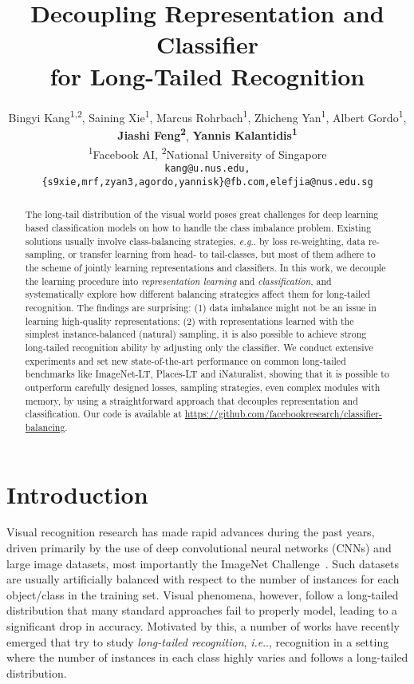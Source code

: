 \documentclass[dvipsnames]{article} \usepackage{iclr2020_conference, times}
\title{Decoupling Representation and Classifier \\ for Long-Tailed Recognition}
\author{Bingyi Kang\textsuperscript{1,2},
Saining Xie\textsuperscript{1},
Marcus Rohrbach\textsuperscript{1},
Zhicheng Yan\textsuperscript{1},
Albert Gordo\textsuperscript{1}, \\ 
\textbf{Jiashi Feng\textsuperscript{2}},
\textbf{Yannis Kalantidis\textsuperscript{1}} \\
\textsuperscript{1}Facebook AI, \textsuperscript{2}National University of Singapore  \\
\texttt{kang@u.nus.edu,\{s9xie,mrf,zyan3,agordo,yannisk\}@fb.com,elefjia@nus.edu.sg}
}
\makeatletter
\DeclareRobustCommand\onedot{\futurelet\@let@token\@onedot}
\def\@onedot{\ifx\@let@token.\else.\null\fi\xspace}
\def\eg{\emph{e.g}\onedot} \def\Eg{\emph{E.g}\onedot}
\def\ie{\emph{i.e}\onedot} \def\Ie{\emph{I.e}\onedot}
\makeatother
\begin{document}
\maketitle
\begin{abstract}

The long-tail distribution of the visual world poses great challenges for deep learning based classification models on how to handle the class imbalance problem. Existing solutions usually involve class-balancing strategies, \eg by loss re-weighting, data re-sampling, or transfer learning from head- to tail-classes, but most of them adhere to the scheme of jointly learning representations and classifiers. In this work, we decouple the learning procedure into \emph{representation learning} and \emph{classification}, and systematically explore how different balancing strategies affect them for long-tailed recognition. The findings are surprising: (1) data imbalance might not be an issue in learning high-quality representations; (2) with representations learned with the simplest instance-balanced (natural) sampling, it is also possible to achieve strong long-tailed recognition ability by adjusting only the classifier. We conduct extensive experiments and set new state-of-the-art performance on common long-tailed benchmarks like ImageNet-LT, Places-LT and iNaturalist, showing that it is possible to outperform carefully designed losses, sampling strategies, even complex modules with memory, by using a straightforward approach that decouples representation and classification. Our code is available at \url{https://github.com/facebookresearch/classifier-balancing}.

\end{abstract} 

\section{Introduction}
\label{sec:introduction}
Visual recognition research has made rapid advances during the past years, driven primarily by the use of deep convolutional neural networks (CNNs) and large image datasets, most importantly the  ImageNet Challenge~\citep{ILSVRC15}. Such datasets are usually artificially balanced with respect to the number of instances for each object/class in the training set.
Visual phenomena, however, follow a long-tailed distribution that many standard approaches fail to properly model, leading to a significant drop in accuracy. Motivated by this, a number of works have recently emerged that try to study \emph{long-tailed recognition}, \ie, recognition in a setting where the number of instances in each  class highly varies and follows a long-tailed distribution.
\end{document}
